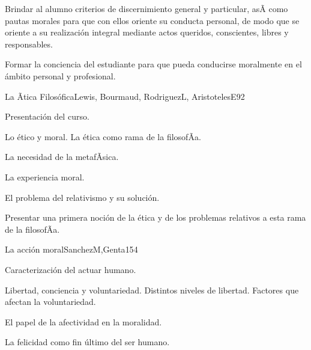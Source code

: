 \begin{syllabus}


\begin{justification}
Brindar al alumno criterios de discernimiento general y particular, asÃ­ como pautas morales para que con ellos oriente su conducta personal, de modo que se oriente a su realización integral mediante actos queridos, conscientes, libres y responsables. 
\end{justification}

\begin{goals}
\item Formar la conciencia del estudiante para que pueda conducirse moralmente en el ámbito personal y profesional.
\end{goals}

\begin{outcomes}
\end{outcomes}

\begin{unit}{La Ãtica Filosófica}{Lewis, Bourmaud, RodriguezL, AristotelesE}{9}{2}
\begin{topics}
	\item	Presentación del curso. 
	\item	Lo ético y moral. La ética como rama de la filosofÃ­a.
	\item	La necesidad de la metafÃ­sica.
	\item	La experiencia moral.
	\item	El problema del relativismo y su solución.
	
\end{topics}
\begin{unitgoals}
	\item Presentar una primera noción de la ética y de los problemas relativos a esta rama de la filosofÃ­a.
\end{unitgoals}
\end{unit}

\begin{unit}{La acción moral}{SanchezM,Genta}{15}{4}
\begin{topics}
	\item	Caracterización del actuar humano. 
	\item	Libertad, conciencia y voluntariedad. Distintos niveles de libertad. Factores que afectan la voluntariedad.
	\item	El papel de la afectividad en la moralidad.
	\item	La felicidad como fin último del ser humano.


\end{topics}
\end{unit}
\end{syllabus}
